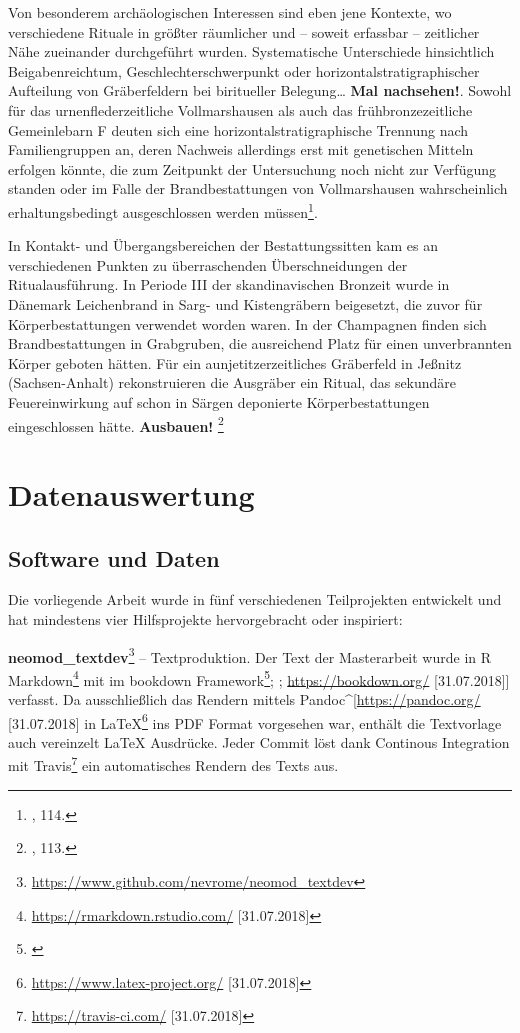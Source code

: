 \documentclass[openany,twoside,twocolumn]{book}
\let\rmarkdownfootnote\footnote%
\def\footnote{\protect\rmarkdownfootnote}
\let\pby\printbibliography
\renewcommand{\printbibliography}{}
\begin{document}
Von besonderem archäologischen Interessen sind eben jene Kontexte, wo
verschiedene Rituale in größter räumlicher und -- soweit erfassbar --
zeitlicher Nähe zueinander durchgeführt wurden. Systematische
Unterschiede hinsichtlich Beigabenreichtum, Geschlechterschwerpunkt oder
horizontalstratigraphischer Aufteilung von Gräberfeldern bei biritueller
Belegung\ldots{} \textbf{Mal nachsehen!}. Sowohl für das
urnenflederzeitliche Vollmarshausen als auch das frühbronzezeitliche
Gemeinlebarn F deuten sich eine horizontalstratigraphische Trennung nach
Familiengruppen an, deren Nachweis allerdings erst mit genetischen
Mitteln erfolgen könnte, die zum Zeitpunkt der Untersuchung noch nicht
zur Verfügung standen oder im Falle der Brandbestattungen von
Vollmarshausen wahrscheinlich erhaltungsbedingt ausgeschlossen werden
müssen\footnote{\textcite{harding_european_2000}, 114.}.

In Kontakt- und Übergangsbereichen der Bestattungssitten kam es an
verschiedenen Punkten zu überraschenden Überschneidungen der
Ritualausführung. In Periode III der skandinavischen Bronzeit wurde in
Dänemark Leichenbrand in Sarg- und Kistengräbern beigesetzt, die zuvor
für Körperbestattungen verwendet worden waren. In der Champagnen finden
sich Brandbestattungen in Grabgruben, die ausreichend Platz für einen
unverbrannten Körper geboten hätten. Für ein aunjetitzerzeitliches
Gräberfeld in Jeßnitz (Sachsen-Anhalt) rekonstruieren die Ausgräber ein
Ritual, das sekundäre Feuereinwirkung auf schon in Särgen deponierte
Körperbestattungen eingeschlossen hätte. \textbf{Ausbauen!} \footnote{\textcite{harding_european_2000},
  113.}

\pby[title={Literatur},segment=\therefsegment,heading=subbibintoc]

\hypertarget{data-analysis}{%
\chapter{Datenauswertung}\label{data-analysis}}

\hypertarget{software-und-daten}{%
\section{Software und Daten}\label{software-und-daten}}

Die vorliegende Arbeit wurde in fünf verschiedenen Teilprojekten
entwickelt und hat mindestens vier Hilfsprojekte hervorgebracht oder
inspiriert:

\textbf{neomod\_textdev}\footnote{\url{https://www.github.com/nevrome/neomod_textdev}}
-- Textproduktion. Der Text der Masterarbeit wurde in R
Markdown\footnote{\url{https://rmarkdown.rstudio.com/} {[}31.07.2018{]}}
mit im bookdown Framework\footnote{\textcite{xie_bookdown_2016}};
\autocite{xie_bookdown_2018}; \url{https://bookdown.org/}
{[}31.07.2018{]}{]} verfasst. Da ausschließlich das Rendern mittels
Pandoc\^{}{[}\url{https://pandoc.org/} {[}31.07.2018{]} in
LaTeX\footnote{\url{https://www.latex-project.org/} {[}31.07.2018{]}}
ins PDF Format vorgesehen war, enthält die Textvorlage auch vereinzelt
LaTeX Ausdrücke. Jeder Commit löst dank Continous Integration mit
Travis\footnote{\url{https://travis-ci.com/} {[}31.07.2018{]}} ein
automatisches Rendern des Texts aus.
\end{document}
